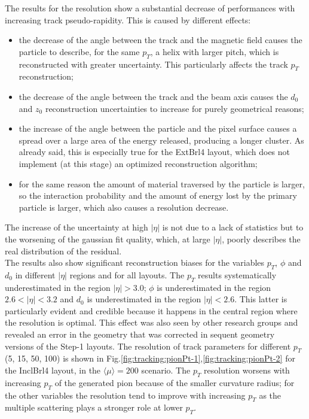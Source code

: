 \documentclass[a4paper,twoside,12pt]{book}
\begin{document}
The results for the resolution show a substantial decrease of performances with increasing track pseudo-rapidity. This is caused by different effects: 

\begin{itemize}
\item the decrease of the angle between  the track and the magnetic field causes the particle to describe, for the same $p_{T}$, a helix with larger pitch,
	which is reconstructed with greater uncertainty. This particularly affects the track $p_{T}$ reconstruction;
\item the decrease of the angle between the track and the beam axis causes the $d_{0}$ and $z_{0}$ reconstruction uncertainties to increase for purely geometrical reasons;
\item the increase of the angle between the particle and the pixel surface causes a spread over a large area of the energy released, producing a longer cluster. As already
said, this is especially true for the ExtBrl4 layout, which does not implement (at this stage) an optimized reconstruction algorithm;
\item for the same reason the amount of material traversed by the particle is larger, so the interaction probability and the amount of energy lost by the primary particle is larger, which also causes a resolution decrease.
\end{itemize}

The increase of the uncertainty at high $|\eta|$ is not due to a lack of statistics but to the
worsening of the gaussian fit quality, which, at large $|\eta|$, poorly describes the real distribution of the residual.\\

The results also show significant reconstruction biases for the variables $p_{T}$, $\phi$ and $d_{0}$ in different $|\eta|$ regions and for all layouts. The $p_{T}$ results systematically underestimated in the region
$|\eta| > 3.0$; 	$\phi$ is underestimated in the region $2.6 < |\eta| < 3.2$ and $d_{0}$  is underestimated in the region $|\eta| < 2.6$. This latter is particularly evident and credible because
it happens in the central region where the resolution is optimal. This effect was also seen by other research groups and revealed an error in the geometry that was corrected in sequent geometry versions of the Step-1 layouts.  
The resolution of track parameters for different $p_{T}$ (5, 15, 50, 100) is shown in Fig.\ref{fig:tracking:pionPt-1},\ref{fig:tracking:pionPt-2} for the InclBrl4 layout, in the $\langle\mu\rangle = 200$ scenario. The $p_{T}$ resolution worsens with
increasing $p_{T}$ of the generated pion because of the smaller curvature radius; 
for the other variables the resolution tend to improve with increasing $p_{T}$ as the 
multiple scattering plays a stronger role at lower $p_{T}$.\\ 
\end{document}
